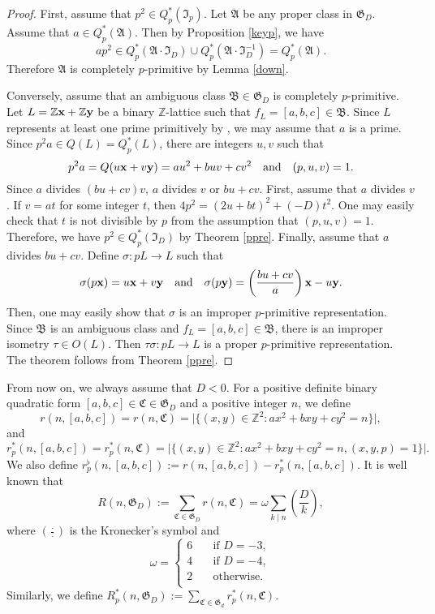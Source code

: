 \documentclass{amsart}
\theoremstyle{definition}
\theoremstyle{remark}
\numberwithin{equation}{section}
\begin{document}
\begin{proof}  First,  assume that $p^2 \in Q_p^*(\mathfrak I_p)$. Let $\mathfrak A$ be any proper class in $\mathfrak G_D$.  Assume that $a \in Q_p^*(\mathfrak A)$.  Then by Proposition \ref{keyp}, we have
$$
ap^2 \in Q_p^*(\mathfrak A\cdot \mathfrak I_D) \cup Q_p^*(\mathfrak A\cdot \mathfrak I_D^{-1})=Q_p^*(\mathfrak A). 
$$
Therefore $\mathfrak A$ is completely $p$-primitive by Lemma \ref{down}.

Conversely, assume that an ambiguous class $\mathfrak B \in \mathfrak G_D$ is completely $p$-primitive. Let $L={{\mathbb Z}} \bold x+{{\mathbb Z}} \bold y$ be a binary ${{\mathbb Z}}$-lattice such that $f_L=[a,b,c] \in \mathfrak B$.  Since $L$ represents at least one prime primitively by \cite{w}, we may assume that $a$ is a prime. Since $p^2a \in Q(L)=Q_p^*(L)$, there are integers  $u,v$ such that 
$$
p^2a=Q(u\bold x+v\bold y)=au^2+buv+cv^2 \quad \text{and} \quad  (p,u,v)=1.
$$ 
Since $a$  divides $(bu+cv)v$, $a$ divides $v$ or $bu+cv$.  First, assume that $a$ divides $v$. If $v=at$ for some integer $t$, then  $4p^2=(2u+bt)^2+(-D)t^2$. One may easily check that $t$ is not divisible by $p$ from the assumption that $(p,u,v)=1$.  
Therefore, we have $p^2 \in Q_p^*(\mathfrak I_D)$ by Theorem \ref{ppre}. 
Finally, assume that $a$ divides $bu+cv$. Define $\sigma : pL \to L$ such that 
$$
\sigma(p\bold x)=u\bold x+v\bold y \quad \text{and} \quad \sigma(p\bold y)=\left(\frac{bu+cv}a\right)\bold x-u\bold y.
$$
Then, one may easily show that $\sigma$ is an improper $p$-primitive representation. Since $\mathfrak B$ is an ambiguous class and $f_L=[a,b,c] \in \mathfrak B$, there is an improper isometry $\tau \in O(L)$. Then $\tau\sigma : pL \to L$ is a proper $p$-primitive representation. The theorem follows from  Theorem \ref{ppre}.   \end{proof}

From now on, we always assume that $D<0$.  For a positive definite binary quadratic form $[a,b,c] \in \mathfrak C \in \mathfrak G_D$ and a positive integer $n$, we define
$$
r(n,[a,b,c])=r(n,\mathfrak C)=\vert\{ (x,y) \in {{\mathbb Z}}^2 : ax^2+bxy+cy^2=n \}\vert,
$$
and
$$
r_p^*(n,[a,b,c])=r_p^*(n,\mathfrak C)=\vert\{ (x,y) \in {{\mathbb Z}}^2 : ax^2+bxy+cy^2=n, (x,y,p)=1 \}\vert.
$$
We also define $r_p^{\flat}(n,[a,b,c]):=r(n,[a,b,c])-r_p^*(n,[a,b,c])$. 
It is well known that 
$$
R(n,\mathfrak G_D):=\sum_{\mathfrak C \in \mathfrak G_D} r(n,\mathfrak C)=\omega \sum_{k \mid n} \left(\frac Dk\right),
$$
where $\left(\frac{\cdot}{\cdot}\right)$ is the Kronecker's symbol and 
$$
\omega=\begin{cases} 6 \quad &\text{if $D=-3$},\\
       4 \quad &\text{if $D=-4$},\\
   2    \quad &\text{otherwise}.\\  \end{cases}
$$
Similarly, we define $R_p^*(n,\mathfrak G_D):=\sum_{\mathfrak C \in \mathfrak G_d} r_p^*(n,\mathfrak C)$.
\end{document}
